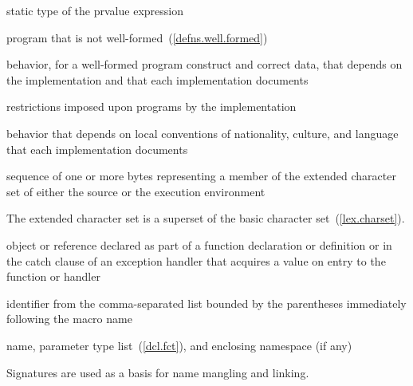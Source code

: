 %
 static type of the prvalue expression

%
program that is not well-formed~(\ref{defns.well.formed})

%
behavior, for a well-formed program construct and correct data, that
depends on the implementation and that each implementation documents

%
restrictions imposed upon programs by the implementation

%
behavior that depends on local conventions of nationality, culture, and
language that each implementation documents

%
sequence of one or more bytes representing a member of the extended
character set of either the source or the execution environment\\
\begin{note} The
extended character set is a superset of the basic character
set~(\ref{lex.charset}).\end{note}

%
%
%
 object or reference declared as part of a function declaration or
definition or in the catch clause of an exception handler that
acquires a value on entry to the function or handler

%
%
 identifier from
the comma-separated list bounded by the parentheses immediately
following the macro name

%
%
 

%
 name, parameter type list~(\ref{dcl.fct}), and enclosing namespace (if any)\\
\begin{note} Signatures are used as a basis for
name mangling and linking.\end{note}

